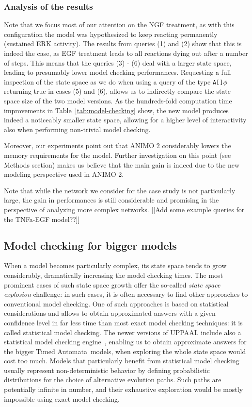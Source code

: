 \documentclass{bmcart}
\def\tas{Timed Automata}
\def\animo2{ANIMO 2}
\begin{document}
\subsubsection*{Analysis of the results}
Note that we focus most of our attention on the NGF treatment, as with this configuration the model
was hypothesized to keep reacting permanently (sustained ERK activity). The results from queries (1) and (2)
show that this is indeed the case, as EGF treatment leads to all reactions dying out after a number of steps.
This means that the queries (3) - (6) deal with a larger state space, leading to presumably lower model checking performances.
Requesting a full inspection of the state space
as we do when using a query of the type {\tt A[]$\phi$} returning true in cases (5) and (6), allows us to indirectly compare the state space size of the two
model versions. As the hundreds-fold computation time improvements in Table~\ref{tab:model-checking} show, the new model produces
indeed a noticeably smaller state space, allowing for a higher level of interactivity also when performing non-trivial model checking.

Moreover, our experiments point out that \animo2{} considerably lowers the memory
requirements for the model. Further investigation on this point (see Methods section)
makes us believe that the main gain is indeed due to the new modeling perspective used in \animo2{}.

Note that while the network we consider for the case study is not particularly large, the gain in performances is still considerable
and promising in the perspective of analyzing more complex networks.
{\Large [[Add some example queries for the TNFa-EGF model??]]}



\subsection*{Model checking for bigger models}
When a model becomes particularly complex, its state space tends to grow considerably, dramatically
increasing the model checking times. The most prominent cases of such state space growth
offer the so-called \emph{state space explosion} challenge: in such cases,
it is often necessary to find other approaches to conventional model checking. One of such approaches is based on statistical
considerations and allows to obtain approximated answers with a given confidence level in far less time
than most exact model checking techniques: it is called statistical model checking. The newer
versions of UPPAAL include also a statistical model checking engine~\cite{uppaal-smc}, enabling
us to obtain approximate answers for the bigger \tas\ models, when exploring the whole state space would cost too much.
Models that particularly benefit from statistical model checking 
usually represent non-deterministic behavior by defining probabilistic distributions for the
choice of alternative evolution paths. Such paths are potentially infinite in number, and their
exhaustive exploration would be mostly impossible using exact model checking.
\end{document}
